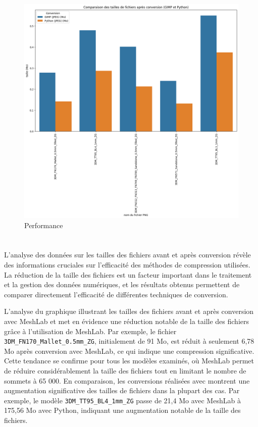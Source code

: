         \begin{figure}[h!]
            \centering
            \includegraphics[width=13cm]{02_images/part_03/03_cvt_dv.png}
            \caption{Performance \cvt}
        \end{figure}
        
        
    \section{\msh}
 
    L'analyse des données sur les tailles des fichiers avant et après conversion révèle des informations cruciales sur l'efficacité des méthodes de compression utilisées. La réduction de la taille des fichiers est un facteur important dans le traitement et la gestion des données numériques, et les résultats obtenus permettent de comparer directement l'efficacité de différentes techniques de conversion.

    L'analyse du graphique illustrant les tailles des fichiers avant et après conversion avec MeshLab et \py met en évidence une réduction notable de la taille des fichiers grâce à l'utilisation de MeshLab. Par exemple, le fichier \texttt{3DM\_FN170\_Mallet\_0.5mm\_ZG}, initialement de 91 Mo, est réduit à seulement 6,78 Mo après conversion avec MeshLab, ce qui indique une compression significative. Cette tendance se confirme pour tous les modèles examinés, où MeshLab permet de réduire considérablement la taille des fichiers tout en limitant le nombre de sommets à 65 000. En comparaison, les conversions réalisées avec \py montrent une augmentation significative des tailles de fichiers dans la plupart des cas. Par exemple, le modèle \texttt{3DM\_TT95\_BL4\_1mm\_ZG} passe de 21,4 Mo avec MeshLab à 175,56 Mo avec Python, indiquant une augmentation notable de la taille des fichiers. 
    
